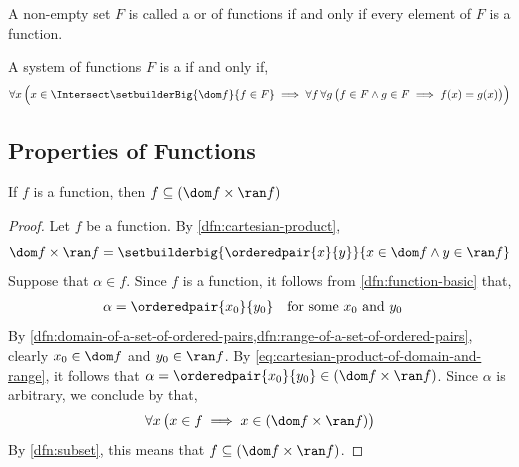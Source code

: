 \begin{dfn}
    \label{dfn:system-of-functions}
    A non-empty set \( F \) is called a  or  of functions
    if and only if every element of \( F \) is a function.
\end{dfn}

\begin{dfn}[Compatibility]
    \label{dfn:compatibility-of-a-system-of-functions}
    A system of functions \( F \) is a  if and only if,
    \begin{equation*}
        \forall x \,
        \Big( x \in \Intersect\setbuilderBig{\dom f}{f \in F}
        \implies
        \forall f \, \forall g \, \big( f \in F \land g \in F \implies f(x) = g(x) \big) \Big)
    \end{equation*}
\end{dfn}

\subsection{Properties of Functions}
\begin{thm}
    \label{thm:a-function-is-a-subset-of-the-cartesian-product-between-its-domain-and-range}
    If \( f \) is a function, then \( f \subseteq \mleft( \dom f \times \ran f \mright) \)
\end{thm}

\begin{proof}
    Let \( f \) be a function. By \cref{dfn:cartesian-product},
    \begin{equation}
        \label{eq:cartesian-product-of-domain-and-range}
        \dom f \times \ran f = \setbuilderbig{\orderedpair{x}{y}}{x \in \dom f \land y \in \ran f}
    \end{equation}
    Suppose that \( \alpha \in f \). Since \( f \) is a function, it follows from \cref{dfn:function-basic}
    that,
    \begin{equation*}
        \begin{aligned}
            \alpha = \orderedpair{x_{0}}{y_{0}} &
        \end{aligned}
        \begin{aligned}
            &\text{for some \( x_{0} \) and \( y_{0} \)}
        \end{aligned}
    \end{equation*}
    By \cref{dfn:domain-of-a-set-of-ordered-pairs,dfn:range-of-a-set-of-ordered-pairs}, clearly
    \( x_{0} \in \dom f\) and \( y_{0} \in \ran f \). By \eqref{eq:cartesian-product-of-domain-and-range},
    it follows that \( \alpha = \orderedpair{x_{0}}{y_{0}} \in \mleft( \dom f \times \ran f \mright) \).
    Since \( \alpha \) is arbitrary, we conclude by  that,
    \begin{equation*}
        \forall x \, \big( x \in f \implies x \in \mleft( \dom f \times \ran f \mright) \big)
    \end{equation*}
    By \cref{dfn:subset}, this means that \( f \subseteq \mleft( \dom f \times \ran f \mright) \).
\end{proof}

